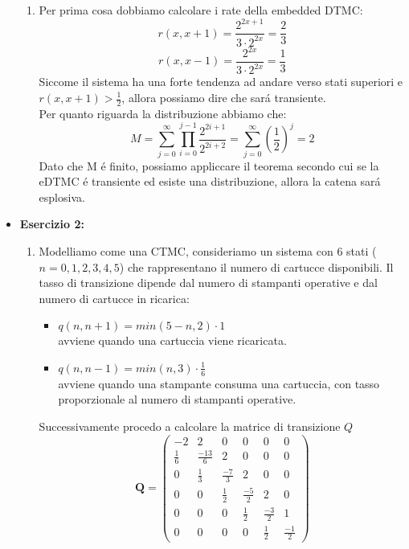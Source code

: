 \documentclass[a4paper,12pt]{article}
\begin{document}
\begin{itemize}
\begin{enumerate}[label=\alph*)]
			\item Per prima cosa dobbiamo calcolare i rate della embedded DTMC:\\
			\[
			r(x,x+1)=\frac{2^{2x+1}}{3 \cdot 2^{2x}}=\frac{2}{3}
			\]
			\[
			r(x,x-1)=\frac{2^{2x}}{3 \cdot 2^{2x}}=\frac{1}{3}
			\]
			Siccome il sistema ha una forte tendenza ad andare verso stati superiori e $r(x,x+1) >\frac{1}{2}$, allora possiamo dire che sará transiente.\\
			Per quanto riguarda la distribuzione abbiamo che:
			\[
			M=\sum_{j=0}^{\infty}\prod_{i=0}^{j-1}\frac{2^{2i+1}}{2^{2i+2}}=\sum_{j=0}^{\infty}(\frac{1}{2})^j=2
			\]
			Dato che M é finito, possiamo appliccare il teorema secondo cui se la eDTMC é transiente ed esiste una distribuzione, allora la catena sará esplosiva.
		\end{enumerate}
		\newpage
		\item \textbf{Esercizio 2: }
		\begin{enumerate}[label=\alph*)]
			\item Modelliamo come una CTMC, consideriamo un sistema con 6 stati ($n=0,1,2,3,4,5$) che rappresentano il numero di cartucce disponibili. Il tasso di transizione dipende dal numero di stampanti operative e dal numero di cartucce in ricarica:\\
			\begin{itemize}
				\item $q(n,n+1)=min(5-n,2) \cdot 1$\\ avviene quando una cartuccia viene ricaricata. 
				\item $q(n,n-1)=min(n,3) \cdot \frac{1}{6}$\\ avviene quando una stampante consuma una cartuccia, con tasso proporzionale al numero di stampanti operative.
			\end{itemize}
			Successivamente procedo a calcolare la matrice di transizione $Q$\\
			\[
			\mathbf{Q} =
			\begin{pmatrix}
				-2 & 2 & 0 & 0 & 0 & 0 \\
				\frac{1}{6} & \frac{-13}{6} & 2 & 0 & 0 & 0 \\
				0 & \frac{1}{3} & \frac{-7}{3} & 2 & 0 & 0 \\
				0 & 0 & \frac{1}{2} & \frac{-5}{2} & 2 & 0 \\
				0 & 0 & 0 & \frac{1}{2} & \frac{-3}{2} & 1 \\
				0 & 0 & 0 & 0 & \frac{1}{2} & \frac{-1}{2}
				

\end{pmatrix}\]
\end{enumerate}
\end{itemize}
\end{document}
